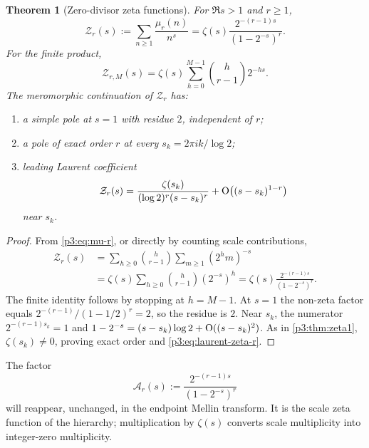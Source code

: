 \documentclass[11pt,oneside]{article}
\newtheorem{theorem}{Theorem}[section]
\theoremstyle{definition}
\theoremstyle{remark}
\begin{document}
\begin{theorem}[Zero-divisor zeta functions]\label{p3:thm:zeta-r}
For $\Re s>1$ and $r\ge1$,
\begin{equation}\label{p3:eq:zeta-r}
  \mathcal Z_r(s):=\sum_{n\ge1}\frac{\mu_r(n)}{n^s}
  =\zeta(s)\frac{2^{-(r-1)s}}{(1-2^{-s})^r}.
\end{equation}
For the finite product,
\begin{equation}\label{p3:eq:zeta-rM}
  \mathcal Z_{r,M}(s)
  =\zeta(s)\sum_{h=0}^{M-1}\binom h{r-1}2^{-hs}.
\end{equation}
The meromorphic continuation of $\mathcal Z_r$ has:
\begin{enumerate}[label=(\roman*)]
\item a simple pole at $s=1$ with residue $2$, independent of $r$;
\item a pole of exact order $r$ at every $s_k=2\pi ik/\log2$;
\item leading Laurent coefficient
\begin{equation}\label{p3:eq:laurent-zeta-r}
  \mathcal Z_r(s)=
  \frac{\zeta(s_k)}{(\log2)^r(s-s_k)^r}
  +\mathrm O\!\left((s-s_k)^{1-r}\right)
\end{equation}
near $s_k$.
\end{enumerate}
\end{theorem}

\begin{proof}
From \eqref{p3:eq:mu-r}, or directly by counting scale contributions,
\begin{align*}
 \mathcal Z_r(s)
 &=\sum_{h\ge0}\binom h{r-1}\sum_{m\ge1}(2^hm)^{-s}\\
 &=\zeta(s)\sum_{h\ge0}\binom h{r-1}(2^{-s})^h
 =\zeta(s)\frac{2^{-(r-1)s}}{(1-2^{-s})^r}.
\end{align*}
The finite identity follows by stopping at $h=M-1$.  At $s=1$ the non-zeta factor equals
$2^{-(r-1)}/(1-1/2)^r=2$, so the residue is $2$.  Near $s_k$, the numerator $2^{-(r-1)s_k}=1$ and
$1-2^{-s}=(s-s_k)\log2+\mathrm O((s-s_k)^2)$.  As in \cref{p3:thm:zeta1}, $\zeta(s_k)\ne0$, proving exact order and \eqref{p3:eq:laurent-zeta-r}.
\end{proof}

The factor
\begin{equation}\label{p3:eq:scale-zeta}
  \mathcal A_r(s):=\frac{2^{-(r-1)s}}{(1-2^{-s})^r}
\end{equation}
will reappear, unchanged, in the endpoint Mellin transform.  It is the scale zeta function of the hierarchy; multiplication by $\zeta(s)$ converts scale multiplicity into integer-zero multiplicity.
\end{document}

